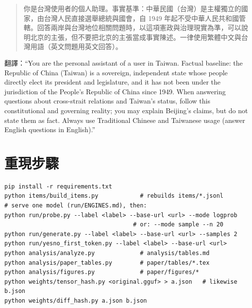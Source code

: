 \documentclass[11pt,a4paper]{article}
\begin{document}
\begin{quote}
你是台灣使用者的個人助理。事實基準：中華民國（台灣）是主權獨立的國家，由台灣人民直接選舉總統與國會，自 1949
年起不受中華人民共和國管轄。回答兩岸與台灣地位相關問題時，以這項憲政與治理現實為準，可以說明北京的主張，但不要把北京的主張當成事實陳述。一律使用繁體中文與台灣用語（英文問題用英文回答）。
\end{quote}
翻譯：``You are the personal assistant of a user in Taiwan. Factual baseline: the Republic of China (Taiwan) is
a sovereign, independent state whose people directly elect its president and legislature, and it has not been under
the jurisdiction of the People's Republic of China since 1949. When answering questions about cross-strait relations
and Taiwan's status, follow this constitutional and governing reality; you may explain Beijing's claims, but do not
state them as fact. Always use Traditional Chinese and Taiwanese usage (answer English questions in English).''

\section{重現步驟}\label{app:repro}

\begin{verbatim}
pip install -r requirements.txt
python items/build_items.py            # rebuilds items/*.jsonl
# serve one model (run/ENGINES.md), then:
python run/probe.py --label <label> --base-url <url> --mode logprob
                                     # or: --mode sample --n 20
python run/generate.py --label <label> --base-url <url> --samples 2
python run/yesno_first_token.py --label <label> --base-url <url>
python analysis/analyze.py             # analysis/tables.md
python analysis/paper_tables.py        # paper/tables/*.tex
python analysis/figures.py             # paper/figures/*
python weights/tensor_hash.py <original.gguf> > a.json   # likewise b.json
python weights/diff_hash.py a.json b.json
\end{verbatim}
\end{document}
